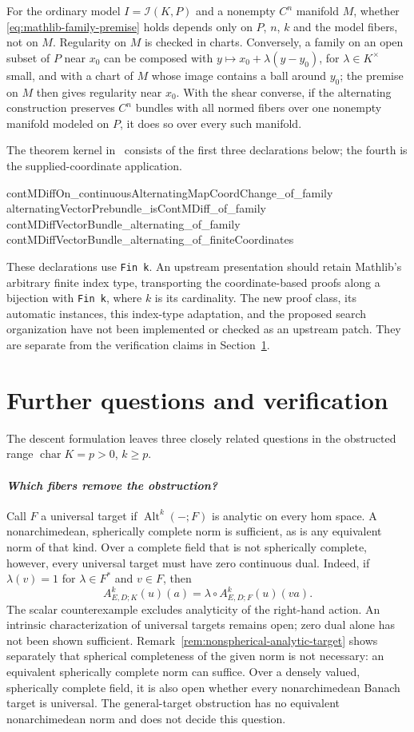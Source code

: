 \documentclass[11pt]{amsart}
\theoremstyle{definition}
\theoremstyle{remark}
\numberwithin{equation}{section}
\newcommand{\Alt}{\operatorname{Alt}}
\begin{document}
For the ordinary model $I=\mathcal I(K,P)$ and a nonempty $C^n$ manifold $M$, whether
\eqref{eq:mathlib-family-premise} holds depends only on $P$, $n$, $k$ and the model fibers, not on $M$.
Regularity on $M$ is checked in charts. Conversely, a family on an open subset of $P$ near $x_0$ can be
composed with $y\mapsto x_0+\lambda(y-y_0)$, for $\lambda\in K^\times$ small, and with a chart of $M$
whose image contains a ball around $y_0$; the premise on $M$ then gives regularity near $x_0$. With the
shear converse, if the alternating construction preserves $C^n$ bundles with all normed fibers over one
nonempty manifold modeled on $P$, it does so over every such manifold.

The theorem kernel in~\cite{LeanP} consists of the first three declarations below; the fourth is
the supplied-coordinate application.
\begin{leancode}
contMDiffOn_continuousAlternatingMapCoordChange_of_family
alternatingVectorPrebundle_isContMDiff_of_family
contMDiffVectorBundle_alternating_of_family
contMDiffVectorBundle_alternating_of_finiteCoordinates
\end{leancode}
These declarations use \texttt{Fin k}. An upstream presentation should retain
Mathlib's arbitrary finite index type, transporting the coordinate-based proofs along a bijection
with \texttt{Fin k}, where $k$ is its cardinality. The new proof class, its automatic instances, this
index-type adaptation, and the proposed search organization have not been implemented or checked
as an upstream patch. They are separate from the verification claims in
Section~\ref{sec:verification}.

\section{Further questions and verification}\label{sec:verification}

The descent formulation leaves three closely related questions in the obstructed range
$\operatorname{char}K=p>0$, $k\ge p$.

\paragraph{\textit{Which fibers remove the obstruction?}}
Call $F$ a universal target if $\Alt^k(-;F)$ is analytic on every hom space. A nonarchimedean,
spherically complete norm is sufficient, as is any equivalent norm of that kind. Over a complete
field that is not spherically complete, however, every universal target must have zero continuous dual.
Indeed, if $\lambda(v)=1$ for $\lambda\in F^*$ and $v\in F$, then
\[
 A^k_{E,D;K}(u)(a)=\lambda\circ A^k_{E,D;F}(u)(v a).
\]
The scalar counterexample excludes analyticity of the right-hand action. An intrinsic characterization
of universal targets remains open; zero dual alone has not been shown sufficient.
Remark~\ref{rem:nonspherical-analytic-target} shows separately that spherical completeness of the
given norm is not necessary: an equivalent spherically complete norm can suffice. Over a densely valued,
spherically complete field, it is also open whether every nonarchimedean Banach target is universal.
The general-target obstruction has no equivalent nonarchimedean norm and does not decide this question.
\end{document}
